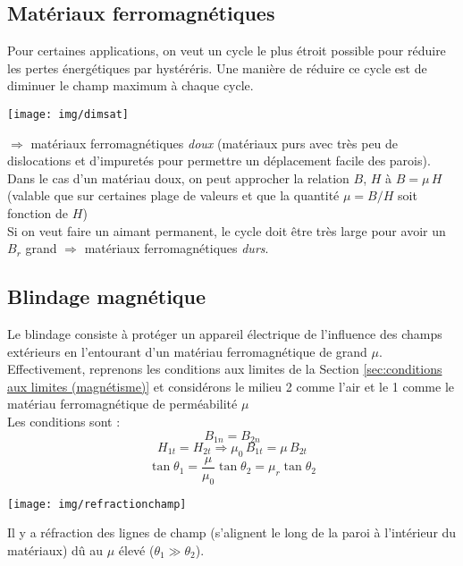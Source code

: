 \documentclass[british,french,11pt, a4paper, openany]{book}
\begin{document}
		\subsection{Matériaux ferromagnétiques}
		Pour certaines applications, on veut un cycle le plus étroit possible pour réduire les pertes énergétiques par hystéréris. Une manière de réduire ce cycle est de diminuer le champ maximum à chaque cycle. \begin{center}
			\texttt{[image: img/dimsat]}
		\end{center}
		$\Rightarrow$ matériaux ferromagnétiques \textit{doux} (matériaux purs avec très peu de dislocations et d'impuretés pour permettre un déplacement facile des parois).\\
		Dans le cas d'un matériau doux, on peut approcher la relation $B$, $H$ à $B=\mu\,H$ (valable que sur certaines plage de valeurs et que la quantité $\mu=B/H$ soit fonction de $H$)\\
		
		Si on veut faire un aimant permanent, le cycle doit être très large pour avoir un $B_r$ grand $\Rightarrow$ matériaux ferromagnétiques \textit{durs}. 
		\subsection{Blindage magnétique}
		Le blindage consiste à protéger un appareil électrique de l'influence des champs extérieurs en l'entourant d'un matériau ferromagnétique de grand $\mu$.\\
		
		Effectivement, reprenons les conditions aux limites de la Section \ref{sec:conditions aux limites (magnétisme)} et considérons le milieu 2 comme l'air et le 1 comme le matériau ferromagnétique de perméabilité $\mu$\\
		Les conditions sont :$$
		B_{1n} =B_{2n}$$\begin{equation}
		H_{1t} =H_{2t}\Rightarrow \mu_0\,B_{1t}=\mu\,B_{2t}\end{equation}$$
		\tan\theta_1 =\frac{\mu}{\mu_0}\tan\theta_2=\mu_r\tan\theta_2$$
		\begin{center}
			\texttt{[image: img/refractionchamp]}
		\end{center}
		Il y a réfraction des lignes de champ (s'alignent le long de la paroi à l'intérieur du matériaux) dû au $\mu$ élevé ($\theta_1\gg\theta_2$).
\end{document}
